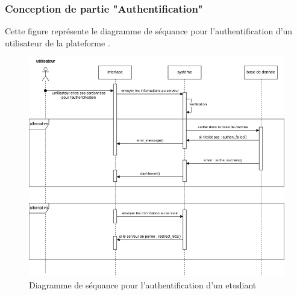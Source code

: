 \subsubsection{Conception de partie "Authentification"}
Cette figure représente le diagramme de séquance pour l'authentification d'un utilisateur de la plateforme .\\
\begin{figure}[h!]
\center
  \includegraphics[width=0.6\linewidth]{pages/image/asma-diagramme_sequence-authentification.jpg}
    \caption{Diagramme de séquance  pour l'authentification d'un etudiant}
    \label{fig:enter-label}
\end{figure}




















